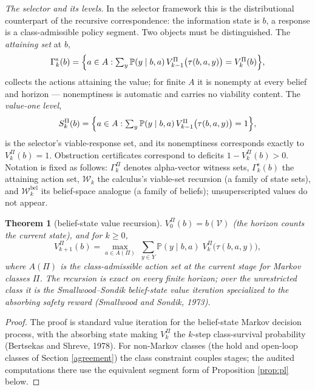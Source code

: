 \documentclass[10pt,twocolumn]{article}
\theoremstyle{plain}
\newtheorem{theorem}{Theorem}
\theoremstyle{definition}
\theoremstyle{remark}
\begin{document}
\emph{The selector and its levels.} In the selector framework this is the
distributional counterpart of the recursive correspondence: the
information state is \(b\), a response is a class-admissible policy
segment. Two objects must be distinguished. The \emph{attaining set} at
\(b\),
\[
\Gamma^{\mathrm{s}}_{k}(b) = \Bigl\{ a \in A : \textstyle\sum_{y}
\mathbb{P}(y \mid b, a)\, V^{\Pi}_{k-1}\bigl(\tau(b, a, y)\bigr)
= V^{\Pi}_{k}(b) \Bigr\},
\]
collects the actions attaining the value; for finite \(A\) it is nonempty
at every belief and horizon --- nonemptiness is automatic and carries no
viability content. The \emph{value-one level},
\[
S^{\Pi}_{k}(b) = \Bigl\{ a \in A : \textstyle\sum_{y} \mathbb{P}(y \mid
b, a)\, V^{\Pi}_{k-1}\bigl(\tau(b, a, y)\bigr) = 1 \Bigr\},
\]
is the selector's viable-response set, and its nonemptiness corresponds
exactly to \(V^{\Pi}_{k}(b) = 1\). Obstruction certificates correspond to
deficits \(1 - V^{\Pi}_{k}(b) > 0\). Notation is fixed as follows:
\(\Gamma^{\Pi}_{k}\) denotes alpha-vector witness sets,
\(\Gamma^{\mathrm{s}}_{k}(b)\) the attaining action set,
\(\mathcal{W}_{k}\) the calculus's viable-set recursion (a family of
state sets), and \(\mathcal{W}^{\mathrm{bel}}_{k}\) its belief-space
analogue (a family of beliefs); unsuperscripted values do not appear.

\begin{theorem}[belief-state value recursion]\label{thm:recursion}
\(V^{\Pi}_{0}(b) = b(\mathcal{V})\) (the horizon counts the current
state), and for \(k \ge 0\),
\[
V^{\Pi}_{k+1}(b) = \max_{a \in A(\Pi)}\; \sum_{y \in Y} \mathbb{P}(y \mid
b, a)\; V^{\Pi}_{k}\bigl(\tau(b, a, y)\bigr),
\]
where \(A(\Pi)\) is the class-admissible action set at the current stage
for Markov classes \(\Pi\). The recursion is exact on every finite
horizon; over the unrestricted class it is the Smallwood--Sondik
belief-state value iteration specialized to the absorbing safety reward
(Smallwood and Sondik, 1973).
\end{theorem}

\begin{proof}
The proof is standard value iteration for the belief-state Markov decision
process, with the absorbing state making \(V^{\Pi}_{k}\) the \(k\)-step
class-survival probability (Bertsekas and Shreve, 1978). For non-Markov
classes (the hold and open-loop classes of Section \ref{agreement}) the
class constraint couples stages; the audited computations there use the
equivalent segment form of Proposition \ref{prop:pl} below.
\end{proof}
\end{document}
